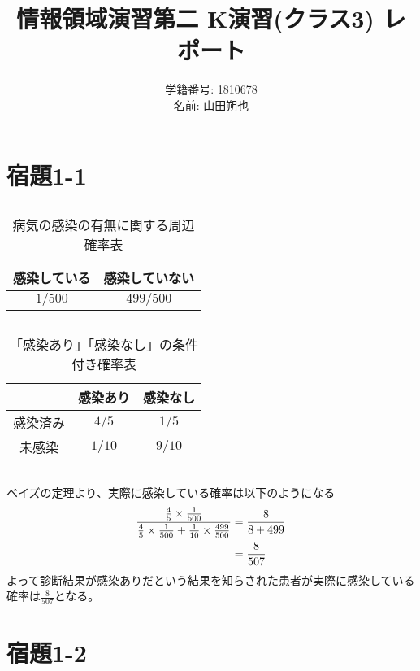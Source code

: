 \documentclass{jsarticle}
\title{情報領域演習第二 K演習(クラス3) レポート}
\author{学籍番号: 1810678 \\
        名前: 山田朔也}
\begin{document}
\maketitle
  \section{宿題1-1}
    \subsection{}
    \begin{table}[H]
      \caption{病気の感染の有無に関する周辺確率表}
      \label{tab1}
      \centering
      \begin{tabular}{c|c}
        感染している & 感染していない \\ \hline
        $1 / 500$ & $499 / 500$ \\
      \end{tabular}
    \end{table}

    \subsection{}
    \begin{table}[H]
      \caption{「感染あり」「感染なし」の条件付き確率表}
      \label{tab2}
      \centering
      \begin{tabular}{c|c|c}
        & 感染あり & 感染なし \\ \hline
        感染済み & $4/5$ & $1/5$ \\ \hline
        未感染  & $1/10$ & $9/10$ \\
      \end{tabular}
    \end{table}

    \subsection{}
      ベイズの定理より、実際に感染している確率は以下のようになる
      \begin{align}
        \frac{\frac{4}{5} \times \frac{1}{500}}{\frac{4}{5} \times \frac{1}{500} + \frac{1}{10} \times \frac{499}{500}}
        &= \frac{8}{8 + 499} \notag \\
        &= \frac{8}{507}
      \end{align}
      よって診断結果が感染ありだという結果を知らされた患者が実際に感染している確率は$\frac{8}{507}$となる。

  \section{宿題1-2}
\end{document}
